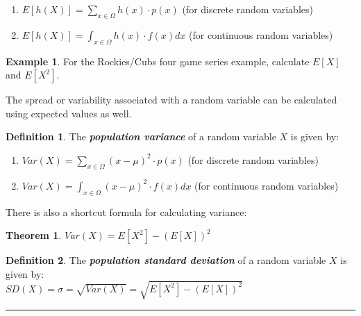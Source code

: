 \documentclass[
  11pt,
]{book}
\newtheorem{theorem}{Theorem}[chapter]
\theoremstyle{definition}
\newtheorem{definition}{Definition}[chapter]
\theoremstyle{definition}
\newtheorem{example}{Example}[chapter]
\theoremstyle{definition}
\theoremstyle{definition}
\theoremstyle{remark}
\begin{document}
\begin{enumerate}
\def\labelenumi{(\roman{enumi})}
\item
  \(E[h(X)] = \sum_{x \in \Omega} h(x) \cdot p(x)\) (for discrete random variables)
\item
  \(E[h(X)] = \int_{x \in \Omega} h(x) \cdot f(x) dx\) (for continuous random variables)
\end{enumerate}

\begin{example}
For the Rockies/Cubs four game series example, calculate \(E[X]\) and \(E[X^2]\).
\end{example}

\hfill\break
\hfill\break
\hfill\break
\hfill\break
\hfill\break

The spread or variability associated with a random variable can be calculated using expected values as well.

\begin{definition}

The \textbf{\emph{population variance}} of a random variable \(X\) is given by:\\

\begin{enumerate}
\def\labelenumi{(\roman{enumi})}
\item
  \(Var(X) = \sum_{x \in \Omega} (x-\mu)^2 \cdot p(x)\) (for discrete random variables)
\item
  \(Var(X) = \int_{x \in \Omega} (x-\mu)^2 \cdot f(x) dx\) (for continuous random variables)
\end{enumerate}

\end{definition}

There is also a shortcut formula for calculating variance:\\

\begin{theorem}
\(Var(X) = E[X^2] - (E[X])^2\)
\end{theorem}

\begin{definition}
The \textbf{\emph{population standard deviation}} of a random variable \(X\) is given by:\\

\(SD(X) = \sigma = \sqrt{Var(X)} = \sqrt{E[X^2]-(E[X])^2}\)
\end{definition}

\begin{center}\rule{0.5\linewidth}{0.5pt}\end{center}
\end{document}
